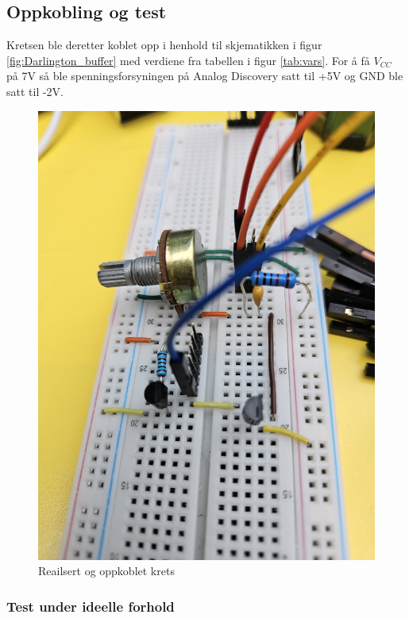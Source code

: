 \subsection{Oppkobling og test}
Kretsen ble deretter koblet opp i henhold til skjematikken i figur \ref{fig:Darlington_buffer} med verdiene fra tabellen i figur \ref{tab:vars}. For å få $V_{CC}$ på 7V så ble spenningsforsyningen på Analog Discovery satt til +5V og GND ble satt til -2V.

\begin{figure}[H]
\centering
\includegraphics[scale=0.1]{bilder/Oppkobling.jpg}
\caption{Reailsert og oppkoblet krets}
\label{fig:Oppkobling}
\end{figure}


\subsubsection{Test under ideelle forhold}

